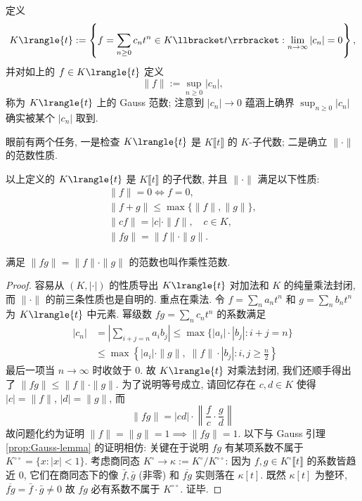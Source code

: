 \begin{definition}\label{def:strictly-convergent-series}
	定义
	\[ K\lrangle{t} := \left\{ f = \sum_{n \geq 0} c_n t^n \in K\llbracket t\rrbracket : \lim_{n \to \infty}|c_n| = 0 \right\},  \]
	并对如上的 $f \in K\lrangle{t}$ 定义
	\[ \|f\| := \sup_{n \geq 0} |c_n|, \]
	称为 $K\lrangle{t}$ 上的 Gauss 范数; 注意到 $|c_n| \to 0$ 蕴涵上确界 $\sup_{n \geq 0} |c_n|$ 确实被某个 $|c_n|$ 取到. 
\end{definition}
眼前有两个任务, 一是检查 $K\lrangle{t}$ 是 $K\llbracket t\rrbracket$ 的 $K$-子代数; 二是确立 $\|\cdot\|$ 的范数性质.

\begin{lemma}\label{prop:strictly-convergent-series-1}
	以上定义的 $K\lrangle{t}$ 是 $K\llbracket t\rrbracket$ 的子代数, 并且 $\|\cdot\|$ 满足以下性质:
	\begin{gather*}
		\|f\| = 0 \iff f=0, \\
		\|f+g\| \leq \max\{\|f\|, \|g\| \}, \\
		\|cf\| = |c| \cdot \|f\|, \quad c \in K, \\
		\|fg\| = \|f\| \cdot \|g\|.
	\end{gather*}
\end{lemma}
满足 $\|fg\| = \|f\| \cdot \|g\|$ 的范数也叫作乘性范数.
\begin{proof}
	容易从 $(K, |\cdot|)$ 的性质导出 $K\lrangle{t}$ 对加法和 $K$ 的纯量乘法封闭, 而 $\|\cdot\|$ 的前三条性质也是自明的. 重点在乘法. 令 $f = \sum_n a_n t^n$ 和 $g = \sum_n b_n t^n$ 为 $K\lrangle{t}$ 中元素. 幂级数 $fg = \sum_n c_n t^n$ 的系数满足
	\begin{align*}
		|c_n| & = \left| \sum_{i+j=n} a_i b_j \right| \leq \max\{ |a_i| \cdot |b_j| : i+j=n \} \\
		& \leq \max\left\{ |a_i| \cdot \|g\|, \; \|f\| \cdot |b_j| : i,j \geq \frac{n}{2} \right\}
	\end{align*}
	最后一项当 $n \to \infty$ 时收敛于 $0$. 故 $K\lrangle{t}$ 对乘法封闭, 我们还顺手得出了 $\|fg\| \leq \|f\| \cdot \|g\|$. 为了说明等号成立, 请回忆存在 $c,d \in K$ 使得 $|c|=\|f\|$, $|d|=\|g\|$, 而
	\[ \|fg\| = |cd| \cdot \left\| \frac{f}{c} \cdot \frac{g}{d} \right\| \]
	故问题化约为证明 $\|f\|=\|g\|=1 \implies \|fg\|=1$. 以下与 Gauss 引理 \ref{prop:Gauss-lemma} 的证明相仿: 关键在于说明 $fg$ 有某项系数不属于 $K^{\circ\circ} = \{x: |x| < 1 \}$. 考虑商同态 $K^\circ \to \kappa := K^\circ/K^{\circ\circ}$: 因为 $f,g \in K^\circ\llbracket t\rrbracket$ 的系数皆趋近 $0$, 它们在商同态下的像 $\bar{f}, \bar{g}$ (非零) 和 $\overline{fg}$ 实则落在 $\kappa[t]$. 既然 $\kappa[t]$ 为整环, $\overline{fg} = \bar{f} \cdot \bar{g} \neq 0$ 故 $fg$ 必有系数不属于 $K^{\circ\circ}$. 证毕.
\end{proof}

